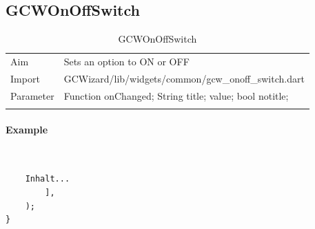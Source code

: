 \newpage
\subsection{GCWOnOffSwitch}
\label{fig: GCWOnOffSwitch}
\begin{table}[H]
\begin{tabular}[h]{p{2cm}p{9cm}}
    \caption{GCWOnOffSwitch}
    Aim       & Sets an option to ON or OFF\\
    Import    & GCWizard/lib/widgets/common/gcw\_onoff\_switch.dart\\
    Parameter & Function onChanged;
                String title;
                value;
                bool notitle;\\
    \label{tab:GCWOnOffSwitch}
\end{tabular}
\end{table}
\paragraph*{Example} \,
\begin{lstlisting}
    Inhalt...
        ],
    );
}
\end{lstlisting}
\label{fig: ExampleGCWOnOffSwitch}

\newpage
